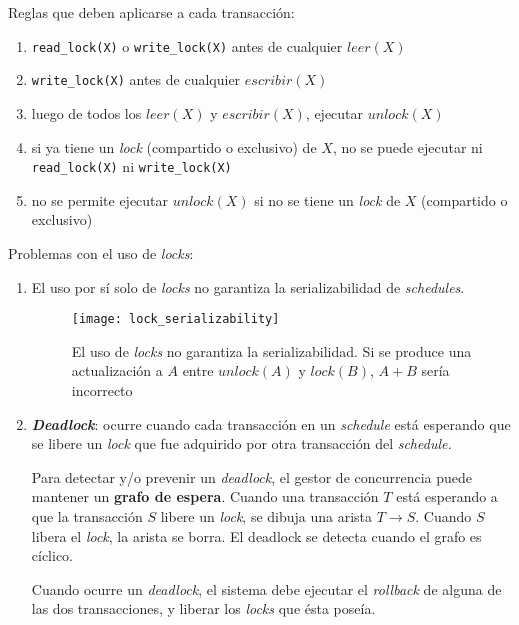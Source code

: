 \documentclass[a4paper, twoside]{article}
\begin{document}
\begin{description}
\begin{enumerate}
Reglas que deben aplicarse a cada transacción:
\begin{enumerate}
\item \texttt{read\_lock(X)} o \texttt{write\_lock(X)} antes de cualquier
$leer(X)$
\item \texttt{write\_lock(X)} antes de cualquier $escribir(X)$
\item luego de todos los $leer(X)$ y $escribir(X)$, ejecutar $unlock(X)$
\item si ya tiene un \emph{lock} (compartido o exclusivo) de $X$, no se
puede ejecutar ni \texttt{read\_lock(X)} ni \texttt{write\_lock(X)}
\item no se permite ejecutar $unlock(X)$ si no se tiene un \emph{lock}
de $X$ (compartido o exclusivo)
\end{enumerate}
\end{enumerate}

Problemas con el uso de \emph{locks}:
\begin{enumerate}
\item El uso por sí solo de \emph{locks} no garantiza la serializabilidad
de \emph{schedules}.


\begin{figure}[H]
\noindent \begin{centering}
\texttt{[image: lock\_serializability]}
\par\end{centering}

\protect\caption{El uso de \emph{locks} no garantiza la serializabilidad. Si se produce
una actualización a $A$ entre $unlock(A)$ y $lock(B)$, \textbf{$A+B$
}sería incorrecto}


\end{figure}


\item \textbf{\emph{Deadlock}}: ocurre cuando cada transacción en un \emph{schedule}
está esperando que se libere un \emph{lock} que fue adquirido por
otra transacción del \emph{schedule.}


Para detectar y/o prevenir un \emph{deadlock}, el gestor de concurrencia
puede mantener un \textbf{grafo de espera}. Cuando una transacción
$T$ está esperando a que la transacción $S$ libere un \emph{lock},
se dibuja una arista $T\to S$. Cuando $S$ libera el \emph{lock},
la arista se borra. El deadlock se detecta cuando el grafo es cíclico.


Cuando ocurre un \emph{deadlock}, el sistema debe ejecutar el \emph{rollback}
de alguna de las dos transacciones, y liberar los \emph{locks} que
ésta poseía.



\end{enumerate}
\end{description}
\end{document}
